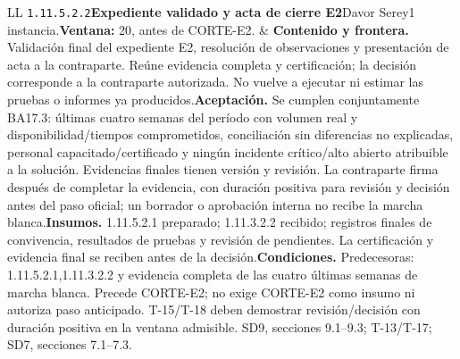 \begin{longtable}{L{\tabcolsep\relax}L{\tabcolsep\relax}}
\texttt{1.\allowbreak{}11.\allowbreak{}5.\allowbreak{}2.\allowbreak{}2}\newline{}\textbf{Expediente validado y acta de cierre E2}\newline{}Davor Serey\newline{}1 instancia.\newline{}\textbf{Ventana:} 20, antes de CORTE-E2. & \textbf{Contenido y frontera.} Validación final del expediente E2, resolución de observaciones y presentación de acta a la contraparte. Reúne evidencia completa y certificación; la decisión corresponde a la contraparte autorizada. No vuelve a ejecutar ni estimar las pruebas o informes ya producidos.\newline{}\textbf{Aceptación.} Se cumplen conjuntamente BA17.3: últimas cuatro semanas del período con volumen real y disponibilidad/tiempos comprometidos, conciliación sin diferencias no explicadas, personal capacitado/certificado y ningún incidente crítico/alto abierto atribuible a la solución. Evidencias finales tienen versión y revisión. La contraparte firma después de completar la evidencia, con duración positiva para revisión y decisión antes del paso oficial; un borrador o aprobación interna no recibe la marcha blanca.\newline{}\textbf{Insumos.} 1.11.5.2.1 preparado; 1.11.3.2.2 recibido; registros finales de convivencia, resultados de pruebas y revisión de pendientes. La certificación y evidencia final se reciben antes de la decisión.\newline{}\textbf{Condiciones.} Predecesoras: 1.11.5.2.1,1.11.3.2.2 y evidencia completa de las cuatro últimas semanas de marcha blanca. Precede CORTE-E2; no exige CORTE-E2 como insumo ni autoriza paso anticipado. T-15/T-18 deben demostrar revisión/decisión con duración positiva en la ventana admisible. SD9, secciones 9.1--9.3; T-13/T-17; SD7, secciones 7.1--7.3.\\\hline

\end{longtable}
